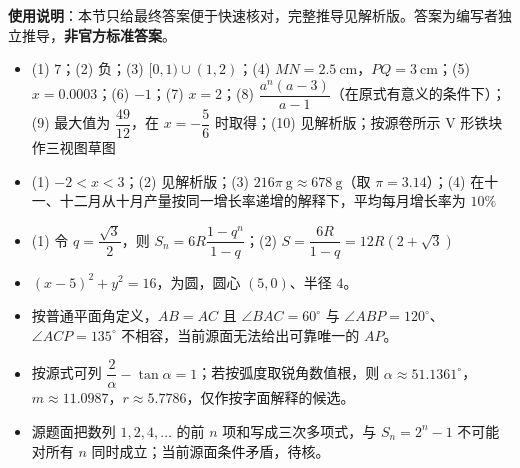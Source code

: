 
\begin{gknotice}
\textbf{使用说明}：本节只给最终答案便于快速核对，完整推导见解析版。答案为编写者独立推导，\textbf{非官方标准答案}。
\end{gknotice}

\begin{itemize}[leftmargin=2.6em]
  \item[\textbf{1.}] (1) $7$；(2) 负；(3) $[0,1)\cup(1,2)$；(4) $MN=2.5\ \mathrm{cm}$，$PQ=3\ \mathrm{cm}$；(5) $x=0.0003$；(6) $-1$；(7) $x=2$；(8) $\dfrac{a^n(a-3)}{a-1}$（在原式有意义的条件下）；(9) 最大值为 $\dfrac{49}{12}$，在 $x=-\dfrac56$ 时取得；(10) 见解析版；按源卷所示 V 形铁块作三视图草图
  \item[\textbf{2.}] (1) $-2<x<3$；(2) 见解析版；(3) $216\pi\ \mathrm g\approx678\ \mathrm g$（取 $\pi=3.14$）；(4) 在十一、十二月从十月产量按同一增长率递增的解释下，平均每月增长率为 $10\%$
  \item[\textbf{3.}] (1) 令 $q=\dfrac{\sqrt3}{2}$，则 $S_n=6R\dfrac{1-q^n}{1-q}$；(2) $S=\dfrac{6R}{1-q}=12R(2+\sqrt3)$
  \item[\textbf{4.}] $(x-5)^2+y^2=16$，为圆，圆心 $(5,0)$、半径 $4$。
  \item[\textbf{5.}] 按普通平面角定义，$AB=AC$ 且 $\angle BAC=60^\circ$ 与 $\angle ABP=120^\circ$、$\angle ACP=135^\circ$ 不相容，当前源面无法给出可靠唯一的 $AP$。
  \item[\textbf{6.}] 按源式可列 $\dfrac2\alpha-\tan\alpha=1$；若按弧度取锐角数值根，则 $\alpha\approx51.1361^\circ$，$m\approx11.0987$，$r\approx5.7786$，仅作按字面解释的候选。
  \item[\textbf{7.}] 源题面把数列 $1,2,4,\ldots$ 的前 $n$ 项和写成三次多项式，与 $S_n=2^n-1$ 不可能对所有 $n$ 同时成立；当前源面条件矛盾，待核。
\end{itemize}
